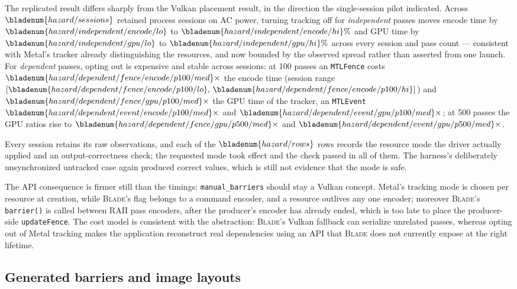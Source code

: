 \documentclass[10pt,twocolumn]{article}
\newcommand{\blade}{\textsc{Blade}}
\begin{document}
The replicated result differs sharply from the Vulkan placement result, in
the direction the single-session pilot indicated. Across
$\bladenum{hazard/sessions}$ retained process sessions on AC power, turning
tracking off for \emph{independent} passes moves encode time by
$\bladenum{hazard/independent/encode/lo}$ to
$\bladenum{hazard/independent/encode/hi}\%$ and GPU time by
$\bladenum{hazard/independent/gpu/lo}$ to
$\bladenum{hazard/independent/gpu/hi}\%$ across every session and pass count
--- consistent with Metal's tracker already distinguishing the resources, and
now bounded by the observed spread rather than asserted from one launch. For
\emph{dependent} passes, opting out is expensive and stable across sessions:
at 100 passes an \texttt{MTLFence} costs
$\bladenum{hazard/dependent/fence/encode/p100/med}\times$ the encode time
(session range
$[\bladenum{hazard/dependent/fence/encode/p100/lo},\,\bladenum{hazard/dependent/fence/encode/p100/hi}]$)
and $\bladenum{hazard/dependent/fence/gpu/p100/med}\times$ the GPU time of
the tracker, an \texttt{MTLEvent}
$\bladenum{hazard/dependent/event/encode/p100/med}\times$ and
$\bladenum{hazard/dependent/event/gpu/p100/med}\times$; at 500 passes the
GPU ratios rise to
$\bladenum{hazard/dependent/fence/gpu/p500/med}\times$ and
$\bladenum{hazard/dependent/event/gpu/p500/med}\times$.

Every session retains its raw observations, and each of the
$\bladenum{hazard/rows}$ rows records the resource mode the driver actually
applied and an output-correctness check; the requested mode took effect and
the check passed in all of them. The harness's deliberately unsynchronized
untracked case again produced correct values, which is still not evidence
that the mode is safe.

The API consequence is firmer still than the timings:
\texttt{manual\_barriers} should stay a Vulkan concept. Metal's tracking mode is chosen per resource at
creation, while \blade's flag belongs to a command encoder, and a resource
outlives any one encoder; moreover \blade's \texttt{barrier()} is called
between RAII pass encoders, after the producer's encoder has already ended,
which is too late to place the producer-side \texttt{updateFence}. The cost
model is consistent with the abstraction: \blade's Vulkan fallback can
serialize unrelated passes, whereas opting out of Metal tracking makes the
application reconstruct real dependencies using an API that \blade{} does not
currently expose at the right lifetime.

\subsection{Generated barriers and image layouts}
\label{sec:generated}
\end{document}
